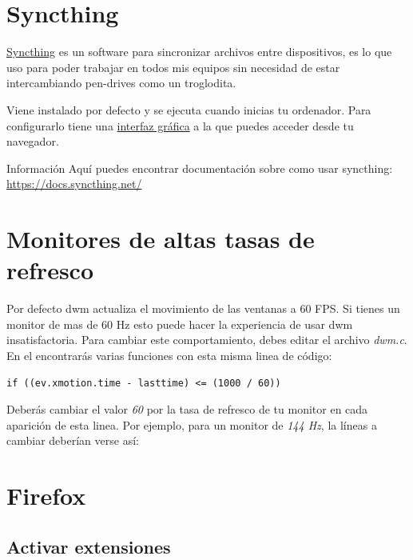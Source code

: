 \documentclass[11pt]{article}
\begin{document}
\section{Syncthing}

\href{https://github.com/syncthing/syncthing}{Syncthing} es un software para sincronizar archivos entre dispositivos, es lo que uso para poder trabajar en todos mis equipos sin necesidad de estar intercambiando pen-drives como un troglodita.

Viene instalado por defecto y se ejecuta cuando inicias tu ordenador. Para configurarlo tiene una \href{http://localhost:8384/}{interfaz gráfica} a la que puedes acceder desde tu navegador.

\begin{mybox}{Información}
Aquí puedes encontrar documentación sobre como usar syncthing: \href{https://docs.syncthing.net/}{https://docs.syncthing.net/}
\end{mybox}

\section{Monitores de altas tasas de refresco}

Por defecto dwm actualiza el movimiento de las ventanas a 60 FPS. Si tienes un monitor de mas de 60 Hz esto puede hacer la experiencia de usar dwm insatisfactoria. Para cambiar este comportamiento, debes editar el archivo \textit{dwm.c}. En el encontrarás varias funciones con esta misma linea de código:

\begin{verbatim}
if ((ev.xmotion.time - lasttime) <= (1000 / 60))
\end{verbatim}

Deberás cambiar el valor \textit{60} por la tasa de refresco de tu monitor en cada aparición de esta linea. Por ejemplo, para un monitor de \textit{144 Hz}, la líneas a cambiar deberían verse así: 

\section{Firefox}

\subsection{Activar extensiones}

\vspace{-15pt}
\end{document}
